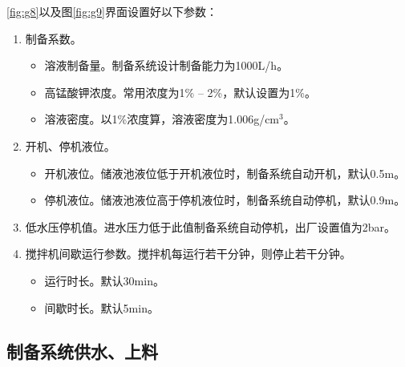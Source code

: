 \documentclass[UTF8,a4paper,12pt,titlepage]{ctexart}
\begin{document}
      \ref{fig:g8}以及图\ref{fig:g9}界面设置好以下参数：
      \begin{enumerate}
         \item 制备系数。
            \begin{itemize}
               \item 溶液制备量。制备系统设计制备能力为1000L/h。
               \item 高锰酸钾浓度。常用浓度为1\% -- 2\%，默认设置为1\%。
               \item 溶液密度。以1\%浓度算，溶液密度为1.006g/cm$^{3}$。
            \end{itemize}
         \item 开机、停机液位。
            \begin{itemize}
               \item 开机液位。储液池液位低于开机液位时，制备系统自动开机，默认0.5m。
               \item 停机液位。储液池液位高于停机液位时，制备系统自动停机，默认0.9m。
            \end{itemize}
         \item 低水压停机值。进水压力低于此值制备系统自动停机，出厂设置值为2bar。
         \item 搅拌机间歇运行参数。搅拌机每运行若干分钟，则停止若干分钟。
            \begin{itemize}
               \item 运行时长。默认30min。
               \item 间歇时长。默认5min。
            \end{itemize}
      \end{enumerate}
      

   \subsection{制备系统供水、上料}
\end{document}
